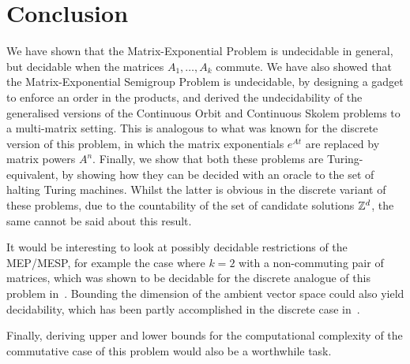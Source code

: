 \section{Conclusion}

We have shown that the Matrix-Exponential Problem is undecidable in general, but decidable when the matrices $A_{1}, \ldots, A_{k}$ commute. We have also showed that the Matrix-Exponential Semigroup Problem is undecidable, by designing a gadget to enforce an order in the products, and derived the undecidability of the generalised versions of the Continuous Orbit and Continuous Skolem problems to a multi-matrix setting. This is analogous to what was known for the discrete version of this problem, in which the matrix exponentials $e^{At}$ are replaced by matrix powers $A^n$. Finally, we show that both these problems are Turing-equivalent, by showing how they can be decided with an oracle to the set of halting Turing machines. Whilst the latter is obvious in the discrete variant of these problems, due to the countability of the set of candidate solutions $\mathbb{Z}^{d}$, the same cannot be said about this result.

It would be interesting to look at possibly decidable restrictions of the MEP/MESP, for example the case where $k=2$ with a non-commuting pair of matrices, which was shown to be decidable for the discrete analogue of this problem in~\cite{MEHTP}. Bounding the dimension of the ambient vector space could also yield decidability, which has been partly accomplished in the discrete case in~\cite{PS2Z}.

Finally, deriving upper and lower bounds for the computational complexity of the commutative case of this problem would also be a worthwhile task.
